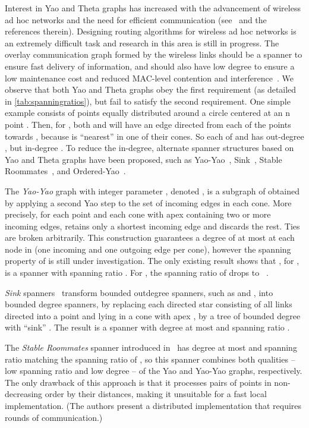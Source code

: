 \documentclass[runningheads,a4paper]{llncs}
\begin{document}
\vspace{-2em}
Interest in Yao and Theta graphs has increased with the advancement of wireless ad hoc networks and the need for efficient communication (see~\cite{RodittyMU08,Chris08,KanjPGe09,CowenLW00} and the references therein). Designing routing algorithms for wireless ad hoc networks is an extremely difficult 
task and research in this area is still in progress. The overlay communication graph formed by the wireless links should be a spanner to ensure fast delivery of information, and should also have low degree to ensure a low maintenance cost and reduced MAC-level contention and interference~\cite{HamR06}. We observe that both Yao and Theta graphs obey the first requirement (as detailed in   \autoref{tab:spanningratios}), but fail to satisfy the second requirement. One simple example consists of  points equally distributed around a circle centered at an n point . Then, for , both  and  will have an edge directed from each of the  points towards , because  is ``nearest'' in one of their cones. So each of  and  has out-degree , but in-degree . To reduce the in-degree, alternate spanner structures based on Yao and Theta graphs have been proposed, such as Yao-Yao~\cite{WL03}, Sink~\cite{LiWanWang01,AryaYY95}, Stable Roommates~\cite{BoseCCCKL13}, and Ordered-Yao~\cite{Song04}. 

The \emph{Yao-Yao} graph with integer parameter , denoted , is a subgraph of  obtained by applying a second Yao step to the set of incoming edges in each cone.  More precisely, for each point  and each cone with apex  containing two or more incoming edges,  retains only a shortest incoming edge and discards the rest. Ties are broken arbitrarily.  This construction guarantees a degree of at most  at each node in  (one incoming and one outgoing edge per cone), however the spanning property of  is still under investigation.  The only existing result shows that , for , is a spanner with spanning ratio . For ,  the spanning ratio of  drops to ~\cite{DB13}. 

\emph{Sink} spanners~\cite{LiWanWang01,AryaYY95} transform bounded outdegree spanners, such as  and , into bounded degree spanners, by replacing  each directed star consisting of all links directed into a point  and lying in a cone with apex , 
by a tree of bounded degree with ``sink'' . The result is a spanner with degree at most  and spanning ratio . 

The \emph{Stable Roommates} spanner introduced in~\cite{BoseCCCKL13} has degree 
at most  and spanning ratio matching the spanning ratio of , so this spanner combines both qualities -- low spanning ratio and low degree -- of the Yao and Yao-Yao graphs, respectively. 
The only drawback of this approach is that it processes pairs of points in non-decreasing order by their distances, making it unsuitable for a fast local implementation. (The authors present a distributed implementation that requires  rounds of communication.) 
\end{document}
